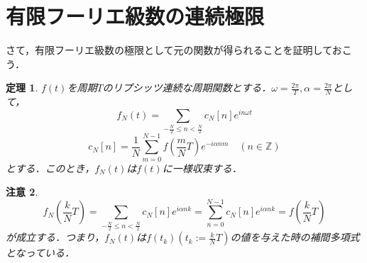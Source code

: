 \documentclass[a4j]{jsbook}
\newtheorem{theorem}{定理}
\newtheorem{rem}[theorem]{注意}
\numberwithin{theorem}{chapter}  %
\begin{document}
\section{有限フーリエ級数の連続極限} \label{sec1-7}
さて，有限フーリエ級数の極限として元の関数が得られることを証明しておこう．
\begin{theorem}
\label{th1-5}
\(f(t)\)を周期\(T\)のリプシッツ連続な周期関数とする．\(\displaystyle\omega=\frac{2\pi}{T}, \alpha=\frac{2\pi}{N}\)として，
\begin{equation*}
    f_N(t)=\sum_{-\frac{N}{2}\leq n<\frac{N}{2}} c_N[n]e^{in\omega t}
\end{equation*}
\begin{equation*}
    c_N[n]=\frac{1}{N}\sum_{m=0}^{N-1}f\left(\frac{m}{N}T\right)e^{-i\alpha nm}\quad (n\in\mathbb{Z})
\end{equation*}
とする．このとき，\(f_N(t)\)は\(f(t)\)に一様収束する．
\end{theorem}
\begin{rem}
\label{rem1-1}
\begin{equation*}
    f_N\left(\frac{k}{N}T\right)=\sum_{-\frac{N}{2}\leq n<\frac{N}{2}}c_N[n]e^{i\alpha nk}=\sum_{n=0}^{N-1}c_N[n]e^{i\alpha nk}=f\left(\frac{k}{N}T\right)
\end{equation*}
が成立する．つまり，\(f_N(t)\)は\(\displaystyle f(t_k)\left(t_k:=\frac{k}{N}T\right)\)の値を与えた時の補間多項式となっている．
\end{rem}
\end{document}
